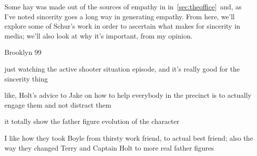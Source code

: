 \documentclass[../butidigress.tex]{subfiles}
\begin{document}
Some hay was made out of the sources of empathy in  in~\ref{sec:theoffice}\ and, as I've noted sincerity goes a long way in generating empathy.
From here, we'll explore some of Schur's work in order to ascertain what makes for sincerity in media; we'll also look at why it's important, from my opinion.



\begin{somenotes}{Brooklyn 99}
    \item just watching the active shooter situation episode, and it's really good for the sincerity thing
    \item like, Holt's advice to Jake on how to help everybody in the precinct is to actually engage them and not distract them
    \item it totally show the father figure evolution of the character
    \item I like how they took Boyle from thirsty work friend, to actual best friend; also the way they changed Terry and Captain Holt to more real father figures
\end{somenotes}
\end{document}
